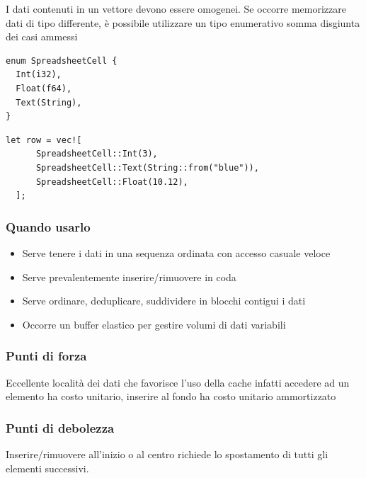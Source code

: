 I dati contenuti in un vettore devono essere omogenei.  Se occorre memorizzare
dati di tipo differente, è possibile utilizzare un tipo enumerativo somma disgiunta
dei casi ammessi

\begin{center}
  \begin{minipage}{0.3\linewidth}
    \begin{verbatim}
enum SpreadsheetCell {
  Int(i32),
  Float(f64),
  Text(String),
}
\end{verbatim}
  \end{minipage}%
  \hfill
  \begin{minipage}{0.65\linewidth}
    \begin{verbatim}
let row = vec![
      SpreadsheetCell::Int(3),
      SpreadsheetCell::Text(String::from("blue")),
      SpreadsheetCell::Float(10.12),
  ];
  \end{verbatim}
  \end{minipage}
\end{center}

\subsubsection{Quando usarlo}

\begin{itemize}
  \item Serve tenere i dati in una sequenza ordinata con accesso casuale
        veloce
  \item Serve prevalentemente inserire/rimuovere in coda
  \item Serve ordinare, deduplicare, suddividere in blocchi contigui i dati
  \item Occorre un buffer elastico per gestire volumi di dati variabili
\end{itemize}


\subsubsection{Punti di forza}
Eccellente località dei dati che favorisce l'uso della cache infatti accedere ad
un elemento ha costo unitario, inserire al fondo ha costo unitario ammortizzato

\subsubsection{Punti di debolezza}

Inserire/rimuovere all'inizio o al centro richiede lo spostamento di tutti gli
elementi successivi.


